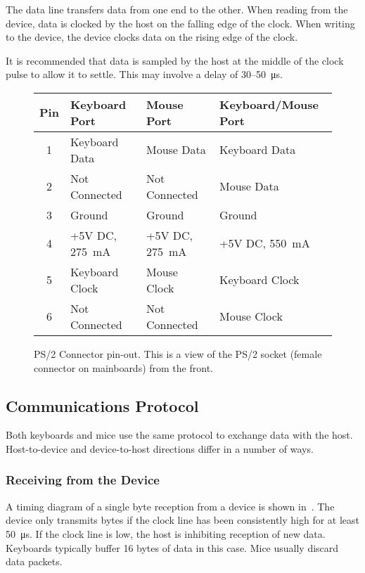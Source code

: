 The data line transfers data from one end to the other. When reading from the
device, data is clocked by the host on the falling edge of the clock. When
writing to the device, the device clocks data on the rising edge of the clock.

It is recommended that data is sampled by the host at the middle of the clock
pulse to allow it to settle. This may involve a delay of 30–50~μs.

\begin{figure*}
  \centering
  \vspace{1em}\par

  \zebra
  \begin{tabular}{clll}
    Pin & Keyboard Port & Mouse Port & Keyboard/Mouse Port \\
    \hline
    1 & Keyboard Data & Mouse Data    & Keyboard Data \\
    2 & Not Connected & Not Connected & Mouse Data \\
    3 & Ground        & Ground        & Ground \\
    4 & +5V DC, 275~mA & +5V DC, 275~mA & +5V DC, 550~mA \\
    5 & Keyboard Clock & Mouse Clock    & Keyboard Clock \\
    6 & Not Connected & Not Connected & Mouse Clock \\
    \hline
  \end{tabular}
  \caption[PS/2 Connector Pin-Out]{\label{fig:kbd-ps2-pinout}PS/2 Connector
    pin-out. This is a view of the PS/2 socket (female connector on mainboards)
    from the front.}
\end{figure*}

\subsection{Communications Protocol}

Both keyboards and mice use the same protocol to exchange data with the
host. Host-to-device and device-to-host directions differ in a number of ways.

\subsubsection{Receiving from the Device}

A timing diagram of a single byte reception from a device is shown
in~. The device only transmits bytes if the clock line
has been consistently high for at least 50~μs. If the clock line is low, the
host is inhibiting reception of new data. Keyboards typically buffer 16 bytes
of data in this case. Mice usually discard data packets.

